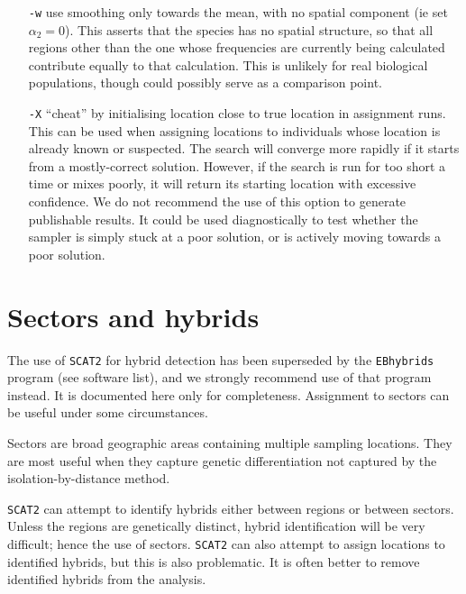 \documentclass[10pt,titlepage,times,letterpaper]{article}
\def\SCAT{{\tt SCAT2} }
\begin{document}
\begin{itemize}
\item[{\tt -w}] use smoothing only towards the mean, with no spatial component (ie set
$\alpha_2 = 0$).  This asserts that the species has no spatial 
structure, so that all regions other than the one whose frequencies are
currently being calculated contribute equally to that calculation.  This is
unlikely for real biological populations, though could possibly serve as
a comparison point.

\item[{\tt -X}] ``cheat'' by initialising location close to true location in assignment runs.  
This can be used when assigning locations to 
individuals whose location is already known or suspected.  The search will
converge more rapidly if it starts from a mostly-correct solution.
However, if the search is run for too short a time or mixes poorly, it will
return its starting location with excessive confidence.  We do not recommend
the use of this option to generate publishable results.
It could be used diagnostically to
test whether the sampler is simply stuck at a poor solution, or is actively
moving towards a poor solution.
\end{itemize}







\section{Sectors and hybrids}

The use of \SCAT for hybrid detection
has been superseded by the {\tt EBhybrids}
program (see software list), and we strongly recommend use of that 
program instead.  It is documented here only for completeness. 
Assignment to sectors can be useful under some circumstances.

Sectors are broad geographic areas containing multiple sampling
locations.  They are most useful when they capture genetic differentiation
not captured by the isolation-by-distance method.

\SCAT can attempt to identify hybrids either between regions or
between sectors.  Unless the regions are genetically
distinct, hybrid identification will be very difficult; hence the
use of sectors.  \SCAT can also attempt to assign locations to
identified hybrids, but this is also problematic.  It is often better
to remove identified hybrids from the analysis.
\end{document}
